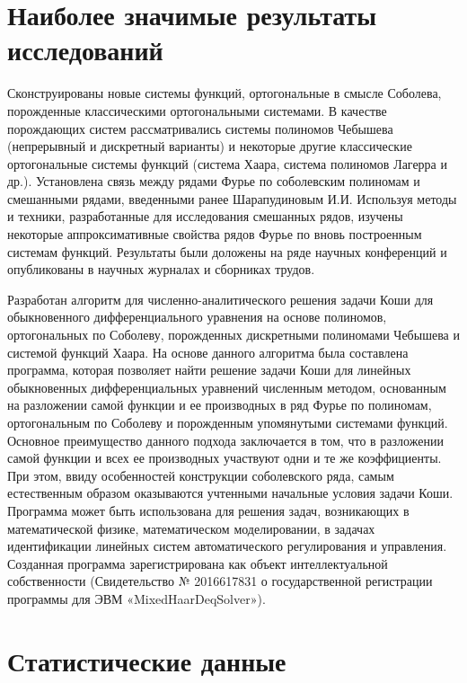 


\chapter{Наиболее значимые результаты исследований}

Сконструированы новые системы функций, ортогональные в смысле Соболева, порожденные классическими ортогональными системами. В качестве порождающих систем рассматривались системы полиномов Чебышева (непрерывный и дискретный варианты) и некоторые другие классические ортогональные системы функций (система Хаара, система полиномов Лагерра и др.). Установлена связь между рядами Фурье по соболевским полиномам и смешанными рядами, введенными ранее Шарапудиновым И.И. Используя методы и техники, разработанные для исследования смешанных рядов, изучены некоторые аппроксимативные свойства рядов Фурье по вновь построенным системам функций. Результаты были доложены на ряде научных конференций и опубликованы в научных журналах и сборниках трудов.


Разработан алгоритм для численно-аналитического решения задачи Коши для обыкновенного дифференциального уравнения на основе полиномов, ортогональных по Соболеву, порожденных дискретными полиномами Чебышева и системой функций Хаара. На основе данного алгоритма была составлена программа, которая позволяет найти решение задачи Коши для линейных обыкновенных дифференциальных уравнений численным методом, основанным на разложении самой функции и ее производных в ряд Фурье по полиномам, ортогональным по Соболеву и порожденным упомянутыми системами функций. Основное преимущество данного подхода заключается в том, что в разложении самой функции и всех ее производных участвуют одни и те же коэффициенты. При этом, ввиду особенностей конструкции соболевского ряда, самым естественным образом оказываются учтенными начальные условия задачи Коши. Программа может быть использована для решения задач, возникающих в математической физике, математическом моделировании, в задачах идентификации линейных систем автоматического регулирования и управления. Созданная программа зарегистрирована как объект интеллектуальной собственности (Свидетельство № 2016617831 о государственной регистрации программы для ЭВМ «MixedHaarDeqSolver»).

\chapter{Статистические данные}

